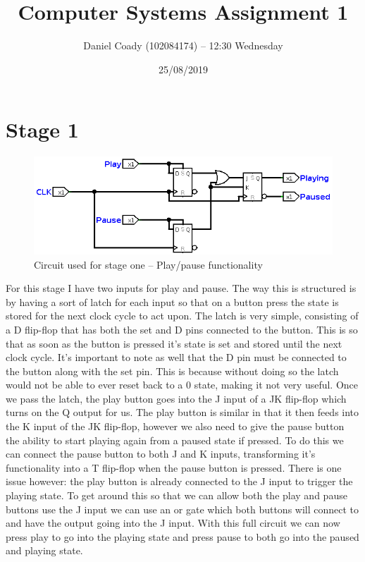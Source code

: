 \documentclass[11pt]{scrartcl}
\title{Computer Systems Assignment 1}
\author{Daniel Coady (102084174) -- 12:30 Wednesday}
\date{25/08/2019}
\begin{document}
\maketitle

\pagebreak

\section*{Stage 1}
\begin{figure}[h]
    \centering
    \includegraphics[scale=0.5]{images/stageone.png}
    \caption{Circuit used for stage one -- Play/pause functionality}
\end{figure}
For this stage I have two inputs for play and pause. The way this is structured is by having
a sort of latch for each input so that on a button press the state is stored for the next
clock cycle to act upon. The latch is very simple, consisting of a D flip-flop that has both
the set and D pins connected to the button. This is so that as soon as the button is pressed
it's state is set and stored until the next clock cycle. It's important to note as well that
the D pin must be connected to the button along with the set pin. This is because without
doing so the latch would not be able to ever reset back to a 0 state, making it not very useful.
Once we pass the latch, the play button goes into the J input of a JK flip-flop which turns
on the Q output for us. The play button is similar in that it then feeds into the K input of
the JK flip-flop, however we also need to give the pause button the ability to start playing
again from a paused state if pressed. To do this we can connect the pause button to both J and
K inputs, transforming it's functionality into a T flip-flop when the pause button is pressed.
There is one issue however: the play button is already connected to the J input to trigger the
playing state. To get around this so that we can allow both the play and pause buttons use the
J input we can use an or gate which both buttons will connect to and have the output going into
the J input. With this full circuit we can now press play to go into the playing state and
press pause to both go into the paused and playing state.
\end{document}
